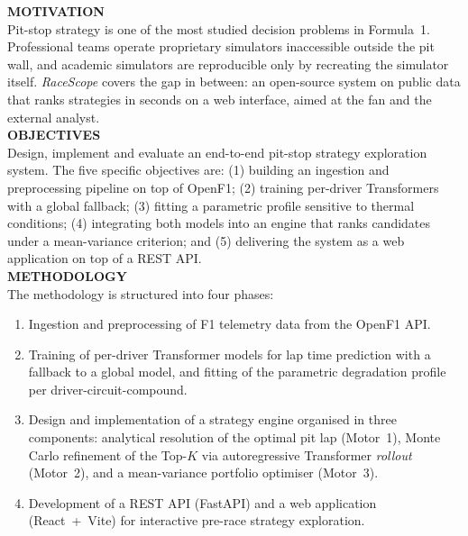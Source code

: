 \documentclass[12pt, a4paper]{book}
\begin{document}
\noindent \textbf{MOTIVATION}\\
Pit-stop strategy is one of the most studied decision problems in Formula~1. Professional teams operate proprietary simulators inaccessible outside the pit wall, and academic simulators are reproducible only by recreating the simulator itself. \textit{RaceScope} covers the gap in between: an open-source system on public data that ranks strategies in seconds on a web interface, aimed at the fan and the external analyst.\\

\noindent \textbf{OBJECTIVES}\\
Design, implement and evaluate an end-to-end pit-stop strategy exploration system. The five specific objectives are: (1) building an ingestion and preprocessing pipeline on top of OpenF1; (2) training per-driver Transformers with a global fallback; (3) fitting a parametric profile sensitive to thermal conditions; (4) integrating both models into an engine that ranks candidates under a mean-variance criterion; and (5) delivering the system as a web application on top of a REST API.\\

\noindent \textbf{METHODOLOGY}\\
The methodology is structured into four phases:
\begin{enumerate}
    \item Ingestion and preprocessing of F1 telemetry data from the OpenF1 API.
    \item Training of per-driver Transformer models for lap time prediction with a fallback to a global model, and fitting of the parametric degradation profile per driver-circuit-compound.
    \item Design and implementation of a strategy engine organised in three components: analytical resolution of the optimal pit lap (Motor~1), Monte Carlo refinement of the Top-$K$ via autoregressive Transformer \textit{rollout} (Motor~2), and a mean-variance portfolio optimiser (Motor~3).
    \item Development of a REST API (FastAPI) and a web application (React~+~Vite) for interactive pre-race strategy exploration.
\end{enumerate}
\vspace{1em}
\end{document}
